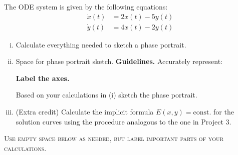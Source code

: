 \documentclass[10pt,twoside,sfsidenotes]{tufte-handout}
\begin{document}
\clearpage
\begin{question}
    The ODE system is given by the following equations:
    \[
        \begin{aligned}
        \dot x(t) &= 2x(t) - 5y(t) \\
        \dot y(t) &= 4x(t) -2y(t)
        \end{aligned}
    \]

    \begin{enumerate}[(i)]
        \item Calculate everything needed to sketch a phase portrait.


        \item
            \begin{marginfigure}\centering
                Space for phase portrait sketch.
                \textbf{Guidelines.} Accurately represent:
                \textbf{Label the axes.}
            \end{marginfigure}
        Based on your calculations in (i) sketch the phase portrait.

        \item (Extra credit) Calculate the implicit formula \(E(x,y) =\text{const.}\)
        for the solution curves using the procedure analogous to the one in Project 3.
    \end{enumerate}

    \begin{center}
        \textsc{\small Use empty space below as needed, but label important parts of your calculations.}
    \end{center}
\end{question}
\end{document}
